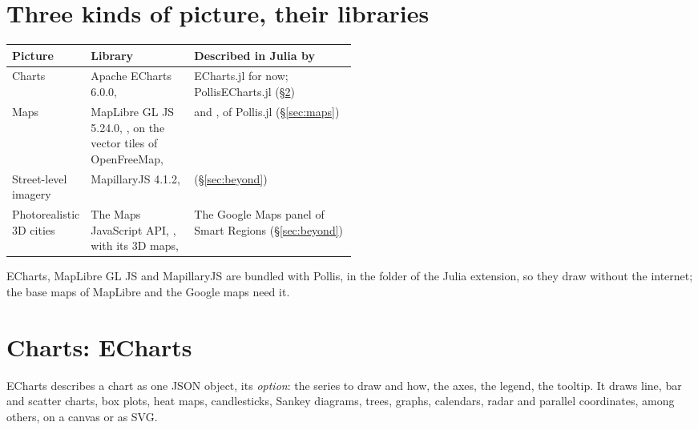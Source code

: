 \section{Three kinds of picture, their libraries}\label{sec:libraries}
\begin{center}\small
\renewcommand{\arraystretch}{1.25}
\begin{tabularx}{\linewidth}{@{}p{0.2\linewidth}p{0.3\linewidth}L@{}}
\toprule
\textbf{Picture} & \textbf{Library} & \textbf{Described in Julia by}\\
\midrule
Charts & Apache ECharts 6.0.0,  & ECharts.jl for now; PollisECharts.jl
  (\S\ref{sec:charts})\\
Maps & MapLibre GL JS 5.24.0, , on the vector tiles of OpenFreeMap,
   &  and , of Pollis.jl (\S\ref{sec:maps})\\
Street-level imagery & MapillaryJS 4.1.2,  & 
  (\S\ref{sec:beyond})\\
Photorealistic 3D cities & The Maps JavaScript API, , with its 3D maps,
   & The Google Maps panel of Smart Regions (\S\ref{sec:beyond})\\
\bottomrule
\end{tabularx}
\end{center}
ECharts, MapLibre GL JS and MapillaryJS are bundled with Pollis, in the folder  of the Julia extension, so
they draw without the internet; the base maps of MapLibre and the Google maps need it.

\section{Charts: ECharts}\label{sec:charts}
ECharts describes a chart as one JSON object, its \emph{option}: the series to draw and how, the axes, the legend,
the tooltip. It draws line, bar and scatter charts, box plots, heat maps, candlesticks, Sankey diagrams, trees,
graphs, calendars, radar and parallel coordinates, among others, on a canvas or as SVG.

